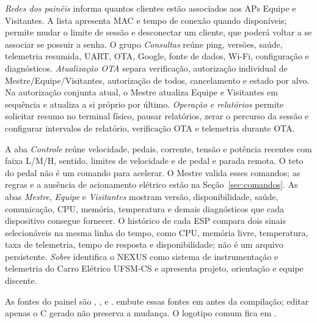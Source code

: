 \emph{Redes dos painéis} informa quantos clientes estão associados aos APs Equipe e Visitantes. A lista apresenta MAC e tempo de conexão quando disponíveis; permite mudar o limite de sessão e desconectar um cliente, que poderá voltar a se associar se possuir a senha. O grupo \emph{Consultas} reúne ping, versões, saúde, telemetria resumida, UART, OTA, Google, fonte de dados, Wi-Fi, configuração e diagnósticos. \emph{Atualização OTA} separa verificação, autorização individual de Mestre/Equipe/Visitantes, autorização de todos, cancelamento e estado por alvo. Na autorização conjunta atual, o Mestre atualiza Equipe e Visitantes em sequência e atualiza a si próprio por último. \emph{Operação e relatórios} permite solicitar resumo no terminal físico, pausar relatórios, zerar o percurso da sessão e configurar intervalos de relatório, verificação OTA e telemetria durante OTA.

A aba \emph{Controle} reúne velocidade, pedais, corrente, tensão e potência recentes com faixa L/M/H, sentido, limites de velocidade e de pedal e parada remota. O teto do pedal não é um comando para acelerar. O Mestre valida esses comandos; as regras e a ausência de acionamento elétrico estão na Seção~\ref{sec:comandos}. As abas \emph{Mestre}, \emph{Equipe} e \emph{Visitantes} mostram versão, disponibilidade, saúde, comunicação, CPU, memória, temperatura e demais diagnósticos que cada dispositivo consegue fornecer. O histórico de cada ESP compara dois sinais selecionáveis na mesma linha do tempo, como CPU, memória livre, temperatura, taxa de telemetria, tempo de resposta e disponibilidade; não é um arquivo persistente. \emph{Sobre} identifica o NEXUS como sistema de instrumentação e telemetria do Carro Elétrico UFSM-CS e apresenta projeto, orientação e equipe discente.

As fontes do painel são , ,  e .  embute essas fontes em  antes da compilação; editar apenas o C gerado não preserva a mudança. O logotipo comum fica em .

